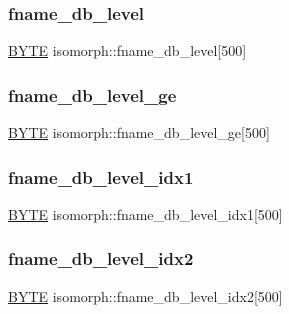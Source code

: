 \subsubsection{\texorpdfstring{fname\+\_\+db\+\_\+level}{fname\_db\_level}}
{\footnotesize\ttfamily \mbox{\hyperlink{galois_8h_ab6cc7b4aeb6ea31aba2b3fbfc83ff5e6}{B\+Y\+TE}} isomorph\+::fname\+\_\+db\+\_\+level\mbox{[}500\mbox{]}}

\mbox{\label{classisomorph_a4e700176be99eaf2064c341799ef3d74}} 
\subsubsection{\texorpdfstring{fname\+\_\+db\+\_\+level\+\_\+ge}{fname\_db\_level\_ge}}
{\footnotesize\ttfamily \mbox{\hyperlink{galois_8h_ab6cc7b4aeb6ea31aba2b3fbfc83ff5e6}{B\+Y\+TE}} isomorph\+::fname\+\_\+db\+\_\+level\+\_\+ge\mbox{[}500\mbox{]}}

\mbox{\label{classisomorph_ae292c21db5ef157f332c60e2d072776c}} 
\subsubsection{\texorpdfstring{fname\+\_\+db\+\_\+level\+\_\+idx1}{fname\_db\_level\_idx1}}
{\footnotesize\ttfamily \mbox{\hyperlink{galois_8h_ab6cc7b4aeb6ea31aba2b3fbfc83ff5e6}{B\+Y\+TE}} isomorph\+::fname\+\_\+db\+\_\+level\+\_\+idx1\mbox{[}500\mbox{]}}

\mbox{\label{classisomorph_a5b4cfbf885bf72842bb996f5e38f8e40}} 
\subsubsection{\texorpdfstring{fname\+\_\+db\+\_\+level\+\_\+idx2}{fname\_db\_level\_idx2}}
{\footnotesize\ttfamily \mbox{\hyperlink{galois_8h_ab6cc7b4aeb6ea31aba2b3fbfc83ff5e6}{B\+Y\+TE}} isomorph\+::fname\+\_\+db\+\_\+level\+\_\+idx2\mbox{[}500\mbox{]}}

